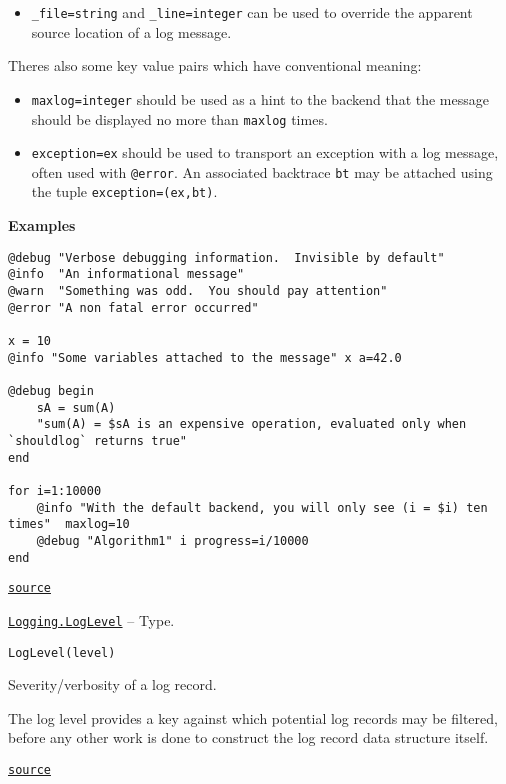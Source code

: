 \begin{adjustwidth}{2em}{0pt}
\begin{itemize}
\item \texttt{\_file=string} and \texttt{\_line=integer} can be used to override the apparent source location of a log message.

\end{itemize}
There{\textquotesingle}s also some key value pairs which have conventional meaning:

\begin{itemize}
\item \texttt{maxlog=integer} should be used as a hint to the backend that the message should be displayed no more than \texttt{maxlog} times.


\item \texttt{exception=ex} should be used to transport an exception with a log message, often used with \texttt{@error}. An associated backtrace \texttt{bt} may be attached using the tuple \texttt{exception=(ex,bt)}.

\end{itemize}
\textbf{Examples}


\begin{lstlisting}
@debug "Verbose debugging information.  Invisible by default"
@info  "An informational message"
@warn  "Something was odd.  You should pay attention"
@error "A non fatal error occurred"

x = 10
@info "Some variables attached to the message" x a=42.0

@debug begin
    sA = sum(A)
    "sum(A) = $sA is an expensive operation, evaluated only when `shouldlog` returns true"
end

for i=1:10000
    @info "With the default backend, you will only see (i = $i) ten times"  maxlog=10
    @debug "Algorithm1" i progress=i/10000
end
\end{lstlisting}



\href{https://github.com/JuliaLang/julia/blob/44fa15b1502a45eac76c9017af94332d4557b251/base/logging.jl#L219-L286}{\texttt{source}}


\end{adjustwidth}
\hypertarget{10879938884267981707}{} 
\hyperlink{10879938884267981707}{\texttt{Logging.LogLevel}}  -- {Type.}

\begin{adjustwidth}{2em}{0pt}


\begin{verbatim}
LogLevel(level)
\end{verbatim}

Severity/verbosity of a log record.

The log level provides a key against which potential log records may be filtered, before any other work is done to construct the log record data structure itself.



\href{https://github.com/JuliaLang/julia/blob/44fa15b1502a45eac76c9017af94332d4557b251/base/logging.jl#L91-L99}{\texttt{source}}


\end{adjustwidth}

